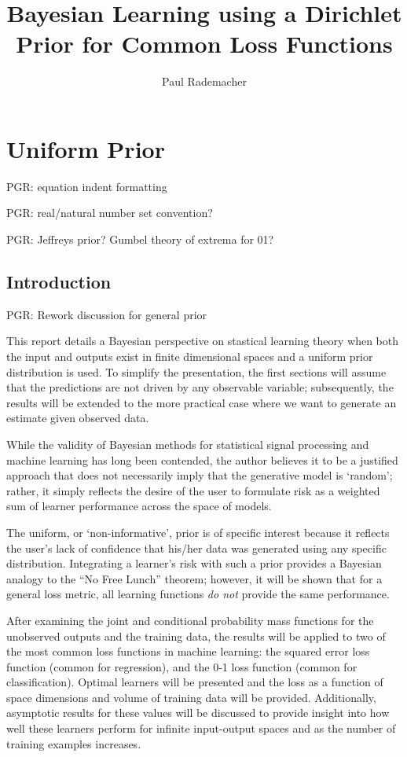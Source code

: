 \documentclass[12pt]{report}
\title{Bayesian Learning using a Dirichlet Prior for Common Loss Functions}
\author{Paul Rademacher}
\begin{document}
\maketitle
\tableofcontents

\chapter{Uniform Prior}

PGR: equation indent formatting

PGR: real/natural number set convention?

PGR: Jeffreys prior? Gumbel theory of extrema for 01?


\section{Introduction}

PGR: Rework discussion for general prior



This report details a Bayesian perspective on stastical learning theory when both the input and outputs exist in finite dimensional spaces and a uniform prior distribution is used. To simplify the presentation, the first sections will assume that the predictions are not driven by any observable variable; subsequently, the results will be extended to the more practical case where we want to generate an estimate given observed data.

While the validity of Bayesian methods for statistical signal processing and machine learning has long been contended, the author believes it to be a justified approach that does not necessarily imply that the generative model is `random'; rather, it simply reflects the desire of the user to formulate risk as a weighted sum of learner performance across the space of models. 

The uniform, or `non-informative', prior is of specific interest because it reflects the user's lack of confidence that his/her data was generated using any specific distribution. Integrating a learner's risk with such a prior provides a Bayesian analogy to the ``No Free Lunch'' theorem; however, it will be shown that for a general loss metric, all learning functions \emph{do not} provide the same performance.

After examining the joint and conditional probability mass functions for the unobserved outputs and the training data, the results will be applied to two of the most common loss functions in machine learning: the squared error loss function (common for regression), and the 0-1 loss function (common for classification). Optimal learners will be presented and the loss as a function of space dimensions and volume of training data will be provided. Additionally, asymptotic results for these values will be discussed to provide insight into how well these learners perform for infinite input-output spaces and as the number of training examples increases. 
\end{document}
